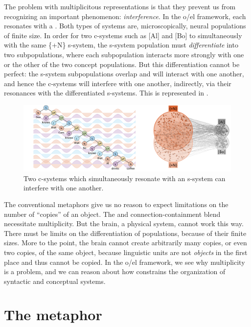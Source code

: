   The problem with multiplicitous representations is that they prevent us from recognizing an important phenomenon: \textit{interference}. In the o/el framework, each  resonates with a . Both types of systems are, microscopically, neural populations of finite size. In order for two c-systems such as [Al] and [Bo] to simultaneously  with the same \{+N\} s-system, the s-system population must \textit{differentiate} into two subpopulations, where each subpopulation interacts more strongly with one or the other of the two concept populations. But this differentiation cannot be perfect: the s-system subpopulations overlap and will interact with one another, and hence the c-systems will interfere with one another, indirectly, via their resonances with the differentiated s-systems. This is represented in {}.

  
\begin{figure}
\includegraphics[width=\textwidth]{figures/Tilsen-img37.png}
\caption{Two c-systems which simultaneously resonate with an s-system can interfere with one another.}
\label{fig:3:9}
\end{figure}
 

  The conventional metaphors give us no reason to expect limitations on the number of “copies” of an object. The  and connection-con\-tain\-ment blend necessitate multiplicity. But the brain, a physical system, cannot work this way. There must be limits on the differentiation of populations, because of their finite sizes. More to the point, the brain cannot create arbitrarily many copies, or even two copies, of the same object, because linguistic units are not \textit{objects} in the first place and thus cannot be copied. In the o/el framework, we see why multiplicity is a problem, and we can reason about how  constrains the organization of syntactic and conceptual systems. 
  
\section{The {} metaphor}

